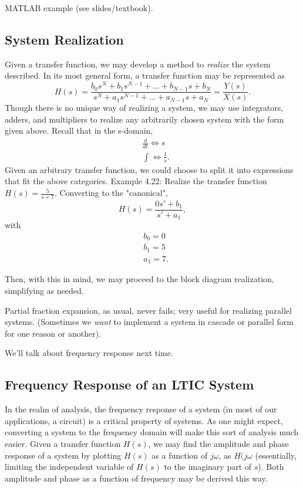 \documentclass{article}
\begin{document}
MATLAB example (see slides/textbook).

\subsection{System Realization}

Given a transfer function, we may develop a method to \textit{realize} the system described. In its most general form, a transfer function may be represented as
\[
	H(s) = \frac{b_0s^N + b_1s^{N-1} + ... + b_{N-1}s+b_N}{s^N + a_1s^{N-1} + ... + a_{N-1}s+a_N} = \frac{Y(s)}{X(s)}.
\]
Though there is no unique way of realizing a system, we may use integrators, adders, and multipliers to realize any arbitrarily chosen system with the form given above. Recall that in the s-domain,
\begin{align*}
	&\frac{d}{dt} \Leftrightarrow s \\
  &\int \Leftrightarrow \frac{1}{s}.
\end{align*}
Given an arbitrary transfer function, we could choose to split it into expressions that fit the above categories.
Example 4.22:
	Realize the transfer function \(H(s) = \frac{5}{s+7}\). Converting to the "canonical",  
\[
  H(s) = \frac{0s' + b_1}{s' + a_1},
\]
with 
\begin{align*}
 &b_0 = 0 \\
 &b_1=5 \\
 &a_1=7.
\end{align*}

Then, with this in mind, we may proceed to the block diagram realization, simplifying as needed. 

Partial fraction expansion, as usual, never fails; very useful for realizing parallel systems. (Sometimes we \textit{want} to implement a system in cascade or parallel form for one reason or another).

We'll talk about frequency response next time.

\setcounter{subsection}{7}
\subsection{Frequency Response of an LTIC System}

In the realm of analysis, the frequency response of a system (in most of our applications, a circuit) is a critical property of systems. As one might expect, converting a system to the frequency domain will make this sort of analysis much easier. Given a transfer function \(H(s)\), we may find the amplitude and phase response of a system by plotting \(H(s)\) as a function of \(j\omega\), as \(H(j\omega\) (essentially, limiting the independent variable of \(H(s)\) to the imaginary part of \(s\)). Both amplitude and phase as a function of frequency may be derived this way.
\end{document}
